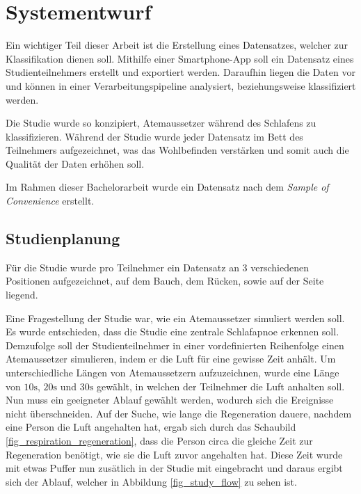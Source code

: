 \chapter{Systementwurf}
\label{ch:Design}

Ein wichtiger Teil dieser Arbeit ist die Erstellung eines Datensatzes, welcher zur Klassifikation dienen soll.
Mithilfe einer Smartphone-App soll ein Datensatz eines Studienteilnehmers erstellt und exportiert werden. 
Daraufhin liegen die Daten vor und können in einer Verarbeitungspipeline analysiert, beziehungsweise klassifiziert werden.

Die Studie wurde so konzipiert, Atemaussetzer während des Schlafens zu klassifizieren. 
Während der Studie wurde jeder Datensatz im Bett des Teilnehmers aufgezeichnet, was das Wohlbefinden verstärken und somit auch die Qualität der Daten erhöhen soll.

Im Rahmen dieser Bachelorarbeit wurde ein Datensatz  nach dem \textit{Sample of Convenience} erstellt.

\section{Studienplanung}
\label{ch:Design:sec:studienplanung}
Für die Studie wurde pro Teilnehmer ein Datensatz an 3 verschiedenen Positionen aufgezeichnet, auf dem Bauch, dem Rücken, sowie auf der Seite liegend.

Eine Fragestellung der Studie war, wie ein Atemaussetzer {\glqq simuliert\grqq} werden soll. 
Es wurde entschieden, dass die Studie eine zentrale Schlafapnoe erkennen soll. 
Demzufolge soll der Studienteilnehmer in einer vordefinierten Reihenfolge einen Atemaussetzer {\glqq simulieren\grqq}, indem er die Luft für eine gewisse Zeit anhält.
Um unterschiedliche Längen von Atemaussetzern aufzuzeichnen, wurde eine Länge von $10\si{\s}$, $20\si{\s}$ und $30\si{\s}$ gewählt, in welchen der Teilnehmer die Luft anhalten soll. 
Nun muss ein geeigneter Ablauf gewählt werden, wodurch sich die Ereignisse nicht überschneiden.
Auf der Suche, wie lange die Regeneration dauere, nachdem eine Person die Luft angehalten hat, ergab sich durch das Schaubild \ref{fig_respiration_regeneration}, dass die Person circa die gleiche Zeit zur Regeneration benötigt, wie sie die Luft zuvor angehalten hat.
Diese Zeit wurde mit etwas Puffer nun zusätlich in der Studie mit eingebracht und daraus ergibt sich der Ablauf, welcher in Abbildung \ref{fig_study_flow} zu sehen ist.


